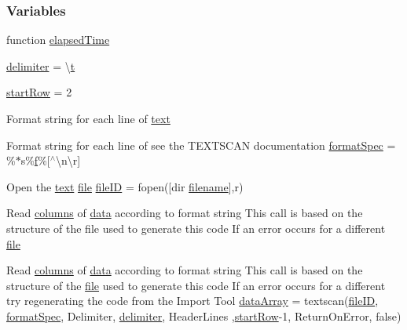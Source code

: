\subsubsection*{Variables}
\begin{DoxyCompactItemize}
\item 
function \hyperlink{a00114_ab95225146f45d9e8e1089618cf68c6e1}{elapsed\+Time}
\item 
\hyperlink{a00114_aacf4e58be14eef37272a71c004bc3f58}{delimiter} = \textquotesingle{}\textbackslash{}\hyperlink{a00107_aaccc9105df5383111407fd5b41255e23}{t}\textquotesingle{}
\item 
\hyperlink{a00114_a987da3ccdd04c7003429ef9f85a24f24}{start\+Row} = 2
\item 
Format string for each line of \hyperlink{a00114_ac3ed6ea030e1a1d6234b110347cad11e}{text}
\item 
Format string for each line of see the T\+E\+X\+T\+S\+C\+A\+N documentation \hyperlink{a00114_ae03fb7cd0dab408f33b554c861354325}{format\+Spec} = \textquotesingle{}\%$\ast$s\%\hyperlink{a00107_a633de4b0c14ca52ea2432a3c8a5c4c31}{f}\%\mbox{[}$^\wedge$\textbackslash{}n\textbackslash{}r\mbox{]}\textquotesingle{}
\item 
Open the \hyperlink{a00114_ac3ed6ea030e1a1d6234b110347cad11e}{text} \hyperlink{a00114_afb14c82a145a51f20aea2593e1d84b86}{file} \hyperlink{a00114_a0535e16c4a03a88fd449c86dc20c47c4}{file\+I\+D} = fopen(\mbox{[}dir \hyperlink{a00107_a4a32877dda2cdbef8aa5f01eacc16f0c}{filename}\mbox{]},\textquotesingle{}r\textquotesingle{})
\item 
Read \hyperlink{a00107_a616e3ce2d5365d3d3c41f5d00d4a1985}{columns} of \hyperlink{a00114_a32d7eebae6f15ceb9cc7f573d7dbd27d}{data} according to format string This call is based on the structure of the file used to generate this code If an error occurs for a different \hyperlink{a00114_afb14c82a145a51f20aea2593e1d84b86}{file}
\item 
Read \hyperlink{a00107_a616e3ce2d5365d3d3c41f5d00d4a1985}{columns} of \hyperlink{a00114_a32d7eebae6f15ceb9cc7f573d7dbd27d}{data} according to format string This call is based on the structure of the \hyperlink{a00114_afb14c82a145a51f20aea2593e1d84b86}{file} used to generate this code If an error occurs for a different try regenerating the code from the Import Tool \hyperlink{a00114_a2234c02acb5c24b59c955753e6ef8441}{data\+Array} = textscan(\hyperlink{a00114_a0535e16c4a03a88fd449c86dc20c47c4}{file\+I\+D}, \hyperlink{a00114_ae03fb7cd0dab408f33b554c861354325}{format\+Spec}, \textquotesingle{}Delimiter\textquotesingle{}, \hyperlink{a00114_aacf4e58be14eef37272a71c004bc3f58}{delimiter}, \textquotesingle{}Header\+Lines\textquotesingle{} ,\hyperlink{a00114_a987da3ccdd04c7003429ef9f85a24f24}{start\+Row}-\/1, \textquotesingle{}Return\+On\+Error\textquotesingle{}, false)

\end{DoxyCompactItemize}
